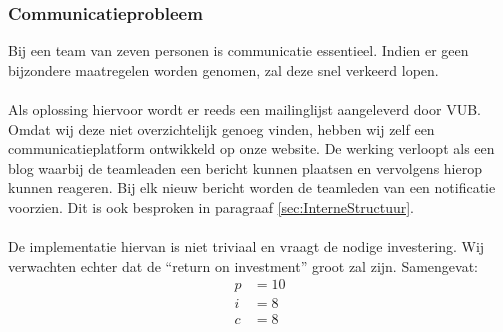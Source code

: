 \subsubsection{Communicatieprobleem}
Bij een team van zeven personen is communicatie essentieel. Indien er geen bijzondere maatregelen worden genomen, zal deze snel verkeerd lopen.
\\
\\
Als oplossing hiervoor wordt er reeds een mailinglijst aangeleverd door VUB. Omdat wij deze niet overzichtelijk genoeg vinden, hebben wij zelf een communicatieplatform ontwikkeld op onze website. De werking verloopt als een blog waarbij de teamleaden een bericht kunnen plaatsen en vervolgens hierop kunnen reageren. Bij elk nieuw bericht worden de teamleden van een notificatie voorzien. Dit is ook besproken in paragraaf \ref{sec:InterneStructuur}.
\\
\\
De implementatie hiervan is niet triviaal en vraagt de nodige investering. Wij verwachten echter dat de ``return on investment'' groot zal zijn. Samengevat:
\begin{align*}
	p &= 10\\
	i &= 8\\
	c &= 8
\end{align*}


